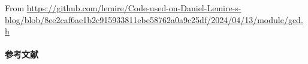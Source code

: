 From \url{https://github.com/lemire/Code-used-on-Daniel-Lemire-s-blog/blob/8ee2caf6ae1b2c915933811ebe58762a0a9c25df/2024/04/13/module/gcd.h}

\paragraph{参考文献} \cite{menezes2018handbook}